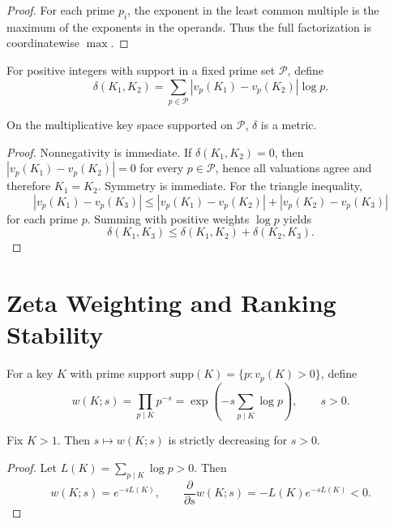 \documentclass[11pt]{article}
\begin{document}
\begin{proof}
For each prime \(p_i\), the exponent in the least common multiple is the maximum of the exponents in the operands. Thus the full factorization is coordinatewise \(\max\).
\end{proof}

\begin{definition}
For positive integers with support in a fixed prime set \(\mathcal{P}\), define
\[
\delta(K_1,K_2) = \sum_{p\in\mathcal{P}} |v_p(K_1)-v_p(K_2)|\log p. \tag{A32}
\]
\end{definition}

\begin{theorem}
On the multiplicative key space supported on \(\mathcal{P}\), \(\delta\) is a metric.
\end{theorem}

\begin{proof}
Nonnegativity is immediate. If \(\delta(K_1,K_2)=0\), then \(|v_p(K_1)-v_p(K_2)|=0\) for every \(p\in\mathcal{P}\), hence all valuations agree and therefore \(K_1=K_2\). Symmetry is immediate. For the triangle inequality,
\[
|v_p(K_1)-v_p(K_3)| \le |v_p(K_1)-v_p(K_2)| + |v_p(K_2)-v_p(K_3)| \tag{A33}
\]
for each prime \(p\). Summing with positive weights \(\log p\) yields
\[
\delta(K_1,K_3) \le \delta(K_1,K_2)+\delta(K_2,K_3). \tag{A34}
\]
\end{proof}

\section{Zeta Weighting and Ranking Stability}
\begin{definition}
For a key \(K\) with prime support \(\mathrm{supp}(K)=\{p : v_p(K)>0\}\), define
\[
w(K;s) = \prod_{p\mid K} p^{-s} = \exp\left(-s\sum_{p\mid K}\log p\right), \qquad s>0. \tag{A35}
\]
\end{definition}

\begin{proposition}
Fix \(K>1\). Then \(s \mapsto w(K;s)\) is strictly decreasing for \(s>0\).
\end{proposition}

\begin{proof}
Let \(L(K)=\sum_{p\mid K}\log p > 0\). Then
\[
w(K;s)=e^{-sL(K)}, \qquad \frac{\partial}{\partial s}w(K;s) = -L(K)e^{-sL(K)} < 0. \tag{A36}
\]
\end{proof}
\end{document}
